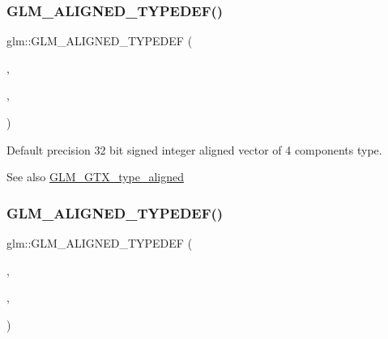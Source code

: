 \subsubsection{\texorpdfstring{G\+L\+M\+\_\+\+A\+L\+I\+G\+N\+E\+D\+\_\+\+T\+Y\+P\+E\+D\+E\+F()}{GLM\_ALIGNED\_TYPEDEF()}\hspace{0.1cm}{\footnotesize\ttfamily [64/209]}}
{\footnotesize\ttfamily glm\+::\+G\+L\+M\+\_\+\+A\+L\+I\+G\+N\+E\+D\+\_\+\+T\+Y\+P\+E\+D\+EF (\begin{DoxyParamCaption}\item[{\hyperlink{group__gtc__type__precision_ga3ada3676600db65a425058c0a150d83e}{i32vec4}}]{,  }\item[{aligned\+\_\+i32vec4}]{,  }\item[{16}]{ }\end{DoxyParamCaption})}

Default precision 32 bit signed integer aligned vector of 4 components type. \begin{DoxySeeAlso}{See also}
\hyperlink{group__gtx__type__aligned}{G\+L\+M\+\_\+\+G\+T\+X\+\_\+type\+\_\+aligned} 
\end{DoxySeeAlso}
\mbox{\label{group__gtx__type__aligned_ga965b1c9aa1800e93d4abc2eb2b5afcbf}} 
\subsubsection{\texorpdfstring{G\+L\+M\+\_\+\+A\+L\+I\+G\+N\+E\+D\+\_\+\+T\+Y\+P\+E\+D\+E\+F()}{GLM\_ALIGNED\_TYPEDEF()}\hspace{0.1cm}{\footnotesize\ttfamily [65/209]}}
{\footnotesize\ttfamily glm\+::\+G\+L\+M\+\_\+\+A\+L\+I\+G\+N\+E\+D\+\_\+\+T\+Y\+P\+E\+D\+EF (\begin{DoxyParamCaption}\item[{\hyperlink{group__gtc__type__precision_ga7ee2c91a98ebd719ae26e15ad89106de}{i64vec1}}]{,  }\item[{aligned\+\_\+i64vec1}]{,  }\item[{8}]{ }\end{DoxyParamCaption})}

